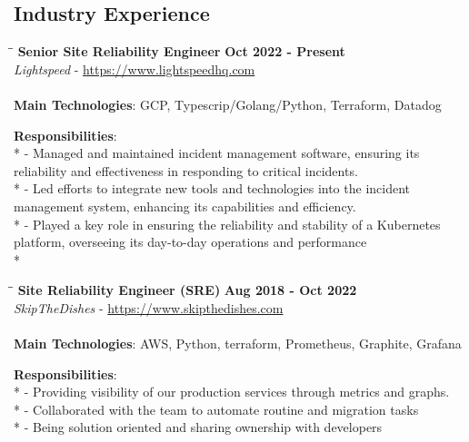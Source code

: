 \documentclass[margin]{res}
\begin{document}
\begin{resume}
  \section{Industry Experience}

\vspace{-0.1in}
\begin{tabbing}
  \hspace{2.3in}\= \hspace{1.7in}\= \kill %
  \textbf{Senior Site Reliability Engineer}    \>\>\textbf{Oct 2022 - Present}\\
  \textit{Lightspeed} - \url{https://www.lightspeedhq.com}\\\\
  \textbf{Main Technologies}: GCP, Typescrip/Golang/Python, Terraform, Datadog
\end{tabbing}\vspace{-20pt}      %
\vspace{2mm}\textbf{Responsibilities}: \\*
  - Managed and maintained incident management software, ensuring its reliability and effectiveness in responding to critical incidents. \\*
  - Led efforts to integrate new tools and technologies into the incident management system, enhancing its capabilities and efficiency. \\*
  - Played a key role in ensuring the reliability and stability of a Kubernetes platform, overseeing its day-to-day operations and performance \\*

\vspace{-0.1in}
\begin{tabbing}
  \hspace{2.3in}\= \hspace{1.7in}\= \kill %
  \textbf{Site Reliability Engineer (SRE)}    \>\>\textbf{Aug 2018 - Oct 2022}\\
  \textit{SkipTheDishes} - \url{https://www.skipthedishes.com}\\\\
  \textbf{Main Technologies}: AWS, Python, terraform, Prometheus, Graphite, Grafana
\end{tabbing}\vspace{-20pt}      %
\vspace{2mm}\textbf{Responsibilities}: \\*
  - Providing visibility of our production services through metrics and graphs. \\*
  - Collaborated with the team to automate routine and migration tasks \\*
  - Being solution oriented and sharing ownership with developers \\


\end{resume}
\end{document}
